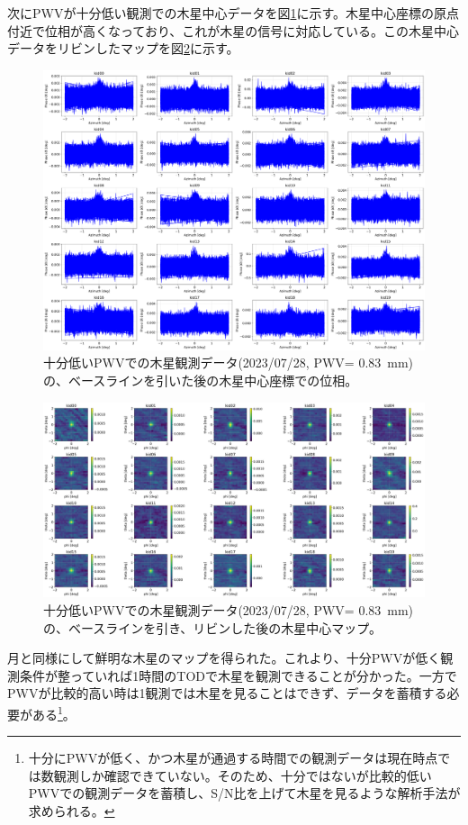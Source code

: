 次にPWVが十分低い観測での木星中心データを図\ref{5987_phase}に示す。木星中心座標の原点付近で位相が高くなっており、これが木星の信号に対応している。この木星中心データをリビンしたマップを図\ref{5987_map}に示す。
\begin{figure}[htbp]
  \centering
  \includegraphics[width=0.65\columnwidth]{5_alignment/figs/5987_jupiter_sub_phase.png}
  \caption{十分低いPWVでの木星観測データ(2023/07/28, PWV= \SI{0.83}{mm})の、ベースラインを引いた後の木星中心座標での位相。}
  \label{5987_phase}
\end{figure}
\begin{figure}[htbp]
  \centering
  \includegraphics[width=0.7\columnwidth]{5_alignment/figs/5987_juputer_map.png}
  \caption{十分低いPWVでの木星観測データ(2023/07/28, PWV= \SI{0.83}{mm})の、ベースラインを引き、リビンした後の木星中心マップ。}
  \label{5987_map}
\end{figure}
月と同様にして鮮明な木星のマップを得られた。これより、十分PWVが低く観測条件が整っていれば1時間のTODで木星を観測できることが分かった。一方でPWVが比較的高い時は1観測では木星を見ることはできず、データを蓄積する必要がある\footnote{十分にPWVが低く、かつ木星が通過する時間での観測データは現在時点では数観測しか確認できていない。そのため、十分ではないが比較的低いPWVでの観測データを蓄積し、S/N比を上げて木星を見るような解析手法が求められる。}。

